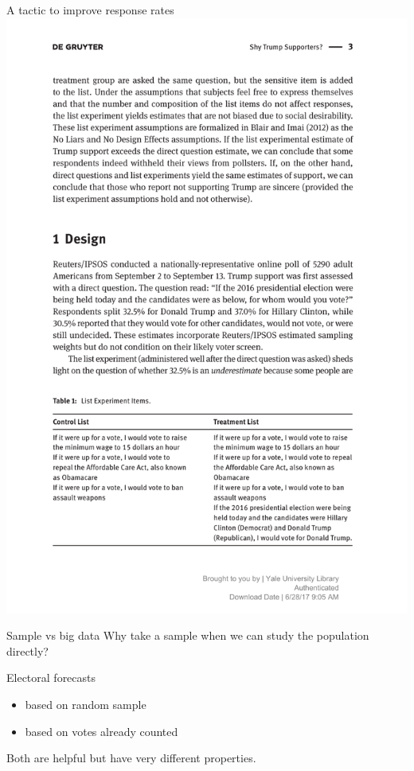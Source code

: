 \documentclass[
  ignorenonframetext,
  aspectratio=54,
]{beamer}
\providecommand{\tightlist}{%
  \setlength{\itemsep}{0pt}\setlength{\parskip}{0pt}}
\begin{document}
\begin{frame}{A tactic to improve response rates}
\protect\hypertarget{a-tactic-to-improve-response-rates}{}
\includegraphics{exhibit/fig/coppock-2017.pdf}
\end{frame}

\begin{frame}{Sample vs big data}
\protect\hypertarget{sample-vs-big-data}{}
Why take a sample when we can study the population directly?
\end{frame}

\begin{frame}{Electoral forecasts}
\protect\hypertarget{electoral-forecasts}{}
\begin{itemize}
\tightlist
\item
  based on random sample
\item
  based on votes already counted
\end{itemize}

Both are helpful but have very different properties.
\end{frame}
\end{document}
